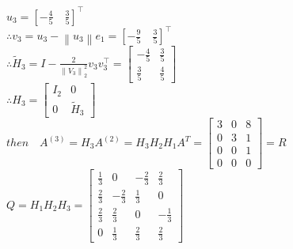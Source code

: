 \documentclass[english,onecolumn]{IEEEtran}
\begin{document}
\begin{enumerate}
$u_{3}=\left[-\frac{4}{5} \quad \frac{3}{5}\right]^{\top}$\\
$\therefore v_{3}=u_{3}-\left\|u_{3}\right\| e_{1}=\left[-\frac{9}{5} \quad \frac{3}{5}\right]^{\top}$\\
$\therefore \tilde{H}_{3}=I-\frac{2}{\left\|V_{3}\right\|_{2}^{2}} v_{3} v_{3}^{\top}=\left[\begin{array}{cc}-\frac{4}{5} & \frac{3}{5} \\ \frac{3}{5} & \frac{4}{5}\end{array}\right]$\\
$\therefore H_{3}=\left[\begin{array}{cc}I_{2} & 0 \\ 0 & \tilde{H}_{3}\end{array}\right]$\\
$then \quad A^{(3)}=H_{3} A^{(2)}=H_{3} H_{2} H_{1} A^{T}=\left[\begin{array}{lll}3 & 0 & 8 \\ 0 & 3 & 1 \\ 0 & 0 & 1 \\ 0 & 0 & 0\end{array}\right]=R$\\
$Q = H_1H_2H_3 =\left[\begin{array}{rrrr}\frac{1}{3} & 0 & -\frac{2}{3} & \frac{2}{3} \\ \frac{2}{3} & -\frac{2}{3} & \frac{1}{3} & 0 \\ \frac{2}{3} & \frac{2}{3} & 0 & -\frac{1}{3} \\ 0 & \frac{1}{3} & \frac{2}{3} & \frac{2}{3}\end{array}\right]$\\


\end{enumerate}
\end{document}
